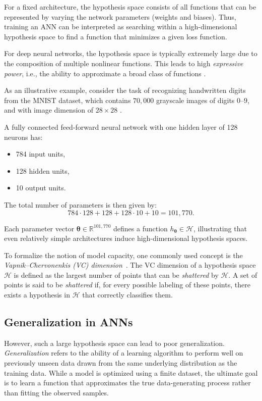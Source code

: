 For a fixed architecture, the hypothesis space consists of all functions that can be represented by varying the network parameters (weights and biases). Thus, training an ANN can be interpreted as searching within a high-dimensional hypothesis space to find a function that minimizes a given loss function.

For deep neural networks, the hypothesis space is typically extremely large due to the composition of multiple nonlinear functions. This leads to high \emph{expressive power}, i.e., the ability to approximate a broad class of functions \cite{goodfellow2016}.  


As an illustrative example, consider the task of recognizing handwritten digits from the MNIST dataset, which contains $70,000$ grayscale images of digits $0$--$9$, and with image dimension of $28 \times 28$ \cite{lecun1998, mnistdataset}.  

A fully connected feed-forward neural network with one hidden layer of 128 neurons has:
\begin{itemize}
    \item 784 input units,
    \item 128 hidden units,
    \item 10 output units.
\end{itemize}

The total number of parameters is then given by:
\[
784 \cdot 128 + 128 + 128 \cdot 10 + 10 = 101{,}770.
\]

Each parameter vector $\boldsymbol{\theta} \in \mathbb{R}^{101{,}770}$ defines a function $h_{\boldsymbol{\theta}} \in \mathcal{H}$, illustrating that even relatively simple architectures induce high-dimensional hypothesis spaces.

To formalize the notion of model capacity, one commonly used concept is the \emph{Vapnik–Chervonenkis (VC) dimension}~\cite{vapnik1998}. The VC dimension of a hypothesis space \( \mathcal{H} \) is defined as the largest number of points that can be \emph{shattered} by \( \mathcal{H} \). A set of points is said to be \emph{shattered} if, for every possible labeling of these points, there exists a hypothesis in \( \mathcal{H} \) that correctly classifies them.

\subsection{Generalization in ANNs}

However, such a large hypothesis space can lead to poor generalization. \textit{Generalization} refers to the ability of a learning algorithm to perform well on previously unseen data drawn from the same underlying distribution as the training data. While a model is optimized using a finite dataset, the ultimate goal is to learn a function that approximates the true data-generating process rather than fitting the observed samples.

